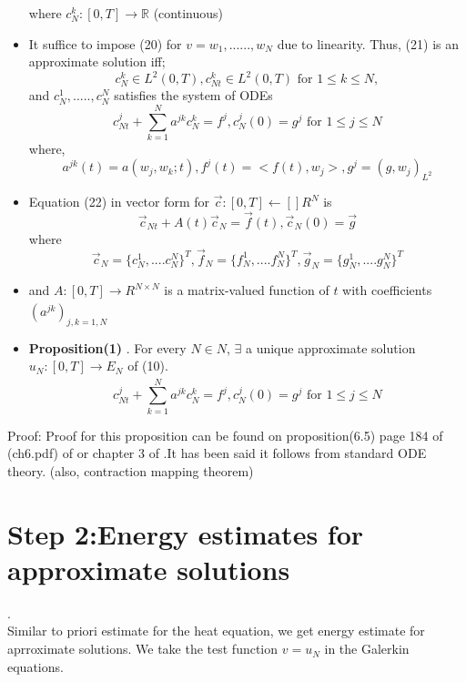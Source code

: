 \begin{itemize}
where $c_{N}^{k}:[0,T]\rightarrow \mathbb{R}$ \quad (continuous)
\item  It suffice  to impose (20) for $v = w_1, ......, w_N$ due to linearity. Thus, (21) is an approximate solution iff;
\begin{equation*}
    c_N^k \in L^2(0,T), c_{Nt}^k \in L^2(0,T) \text{ for } 1 \leq k \leq N,
\end{equation*}
and $c_N^1,.....,c_N^N$ satisfies the system of ODEs
\begin{equation}
    c_{Nt}^j + \sum_{k=1}^N a^{jk}c_N^k = f^j, c_N^j(0) = g^j \text{  for  } 1 \leq j \leq N
\end{equation}
where,
\begin{equation*}
    a^{jk}(t) = a(w_j,w_k;t), f^j(t) = <f(t), w_j>, g^j = (g,w_j)_{L^2}
\end{equation*}
\item Equation (22)  in vector form for $\Vec{c}:[0,T] \leftarrow[]{} R^N $ is
\begin{equation}
    \Vec{c}_{Nt} + A(t)\Vec{c}_N = \Vec{f}(t), \Vec{c}_N(0) = \Vec{g}
\end{equation}
where
\begin{equation*}
    \Vec{c}_N = \{c_N^1,....c_N^N\}^T, \Vec{f}_N = \{f_N^1,....f_N^N\}^T, \Vec{g}_N = \{g_N^1,....g_N^N\}^T
\end{equation*}
\item and $A:[0,T] \xrightarrow[]{} R^{N \times N}$ is a matrix-valued function of $t$ with coefficients $(a^{jk})_{j,k = 1,N}$
\item \textbf{Proposition(1)} . For every $N \in N$, $\exists$ a unique approximate solution
$u_N: [0, T ] \xrightarrow[]{} E_N$ of (10).
\begin{equation*}
   c_{Nt}^j + \sum_{k=1}^N a^{jk}c_N^k = f^j, c_N^j(0) = g^j \text{  for  } 1 \leq j \leq N
\end{equation*}

\end{itemize}
Proof: Proof for this proposition can be found on proposition(6.5) page 184 of (ch6.pdf) of \cite{lecture2} or chapter 3 of \cite{ahmed}.It has been said it follows from standard ODE theory. (also, contraction mapping theorem)








\math\section*{ Step 2:Energy estimates for approximate solutions}.\\
Similar to priori estimate for the heat equation, we get energy estimate for aprroximate solutions. We take the test function $v = u_N$ in the Galerkin equations.

